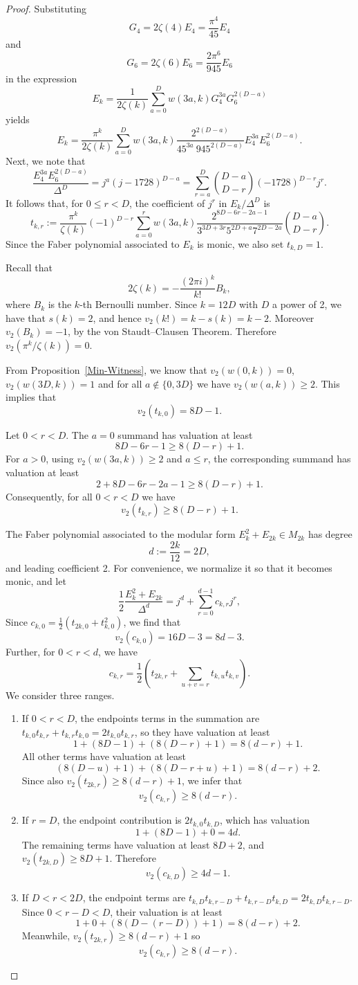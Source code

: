 \documentclass[12pt]{amsart}
\begin{document}
\begin{proof}
Substituting \[G_4=2\zeta(4)E_4=\frac{\pi^4}{45}E_4\] and \[G_6=2\zeta(6)E_6=\frac{2\pi^6}{945}E_6\] in the expression 
\[E_k=\frac{1}{2\zeta(k)} \sum_{a=0}^D w(3a,k)G_4^{3a} G_6^{2(D-a)}\] yields
\[ E_k=\frac{\pi^k}{2 \zeta(k)}\sum_{a=0}^D w(3a,k) \frac{2^{2(D-a)}}{45^{3a} ~ 945^{2(D-a)}} E_4^{3a} E_6^{2(D-a)}.\]
Next, we note that 
\[ \frac{E_4^{3a}E_6^{2(D-a)}}{\Delta^D}=j^a (j-1728)^{D-a}=\sum_{r=a}^D\binom{D-a}{D-r} (-1728)^{D-r}j^r.\] It follows that, for $0\le r<D$, the coefficient of $j^r$ in $E_k/\Delta^D$ is 
\[ t_{k,r} := \frac{\pi^k}{\zeta(k)} (-1)^{D-r} \sum_{a=0}^r w(3a,k) \frac{2^{8D-6r-2a-1}}{3^{3D+3r}5^{2D+a}7^{2D-2a}} \binom{D-a}{D-r}.
\] Since the Faber polynomial associated to $E_k$ is monic, we also set $t_{k,D}=1$. 

Recall that \[ 2 \zeta(k) =-\frac{(2 \pi i)^k}{k!} B_k,\] where $B_k$ is the $k$-th Bernoulli number. Since $k=12D$ with $D$ a power of 2, we have that $s(k)=2$, and hence $v_2(k!)=k-s(k)=k-2$. Moreover $v_2(B_k)=-1$, by the von Staudt--Clausen Theorem. Therefore $v_2(\pi^k/\zeta(k))=0$.   

From Proposition~\ref{Min-Witness}, we know that $v_2(w(0,k))=0$, $v_2(w(3D,k))=1$ and for all $a\notin\{0,3D\}$ we have $v_2(w(a,k))\ge 2$. This implies that \[v_2(t_{k,0}) = 8D-1.\]

Let $0<r<D$. The $a=0$ summand has valuation at least
\[ 8D-6r-1 \ge 8(D-r)+1.\]
For $a>0$, using $v_2(w(3a,k))\ge 2$ and $a\le r$, the corresponding
summand has valuation at least
\[ 2+8D-6r-2a-1\ge 8(D-r)+1. \]
Consequently, for all $0<r<D$ we have
\[ v_2(t_{k,r})\ge 8(D-r)+1.\]

The Faber polynomial associated to the modular form $E_k^2+E_{2k}\in M_{2k}$ has degree \[d:=\frac{2k}{12}=2D,\] and leading coefficient 2. For convenience, we normalize it so that it becomes monic, and let
\[ \frac{1}{2}\frac{E_k^2+E_{2k}}{\Delta^d}=j^d+\sum_{r=0}^{d-1} c_{k,r}j^r,\] Since $c_{k,0}=\frac{1}{2}\left( t_{2k,0}+t_{k,0}^2 \right)$, we find that \[v_2(c_{k,0})=16D-3=8d-3.\] 
Further, for $0<r<d$, we have
\[ c_{k,r}=\frac{1}{2} \left(t_{2k,r}+\sum_{u+v=r} t_{k,u}t_{k,v} \right).\] We consider three ranges.

\begin{enumerate}
\item If $0<r<D$, the endpoints terms in the summation are $t_{k,0}t_{k,r}+t_{k,r}t_{k,0}=2t_{k,0}t_{k,r}$, so they have valuation at least
\[ 1+(8D-1)+(8(D-r)+1)=8(d-r)+1.\] All other terms have valuation at least 
\[ (8(D-u)+1)+(8(D-r+u)+1)=8(d-r)+2.\] Since also $v_2(t_{2k,r})\ge 8(d-r)+1$, we infer that 
\[ v_2(c_{k,r})\ge 8(d-r).\] 
\item If $r=D$, the endpoint contribution is $2t_{k,0}t_{k,D}$, which has valuation \[1+(8D-1)+0=4d.\] The remaining terms have valuation at least $8D+2$, and $v_2(t_{2k,D})\ge 8D+1$. Therefore \[v_2(c_{k,D})\ge 4d-1.\] 
\item If $D<r<2D$, the endpoint terms are $t_{k,D}t_{k,r-D}+t_{k,r-D}t_{k,D}=2t_{k,D}t_{k,r-D}$. Since $0<r-D<D$, their valuation is at least 
\[ 1+0+(8(D-(r-D))+1)=8(d-r)+2.\] Meanwhile, $v_2(t_{2k,r})\ge 8(d-r)+1$ so
\[ v_2(c_{k,r})\ge 8(d-r).\] 
\end{enumerate}


\end{proof}
\end{document}
